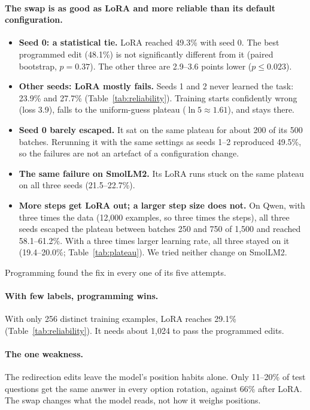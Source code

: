 \paragraph{The swap is as good as LoRA and more reliable than its default configuration.}
\begin{itemize}
  \item \textbf{Seed 0: a statistical tie.} LoRA reached 49.3\% with seed 0. The best programmed edit (48.1\%) is not significantly different from it (paired bootstrap, $p=0.37$). The other three are 2.9--3.6 points lower ($p\le0.023$).
  \item \textbf{Other seeds: LoRA mostly fails.} Seeds 1 and 2 never learned the task: 23.9\% and 27.7\% (Table~\ref{tab:reliability}). Training starts confidently wrong (loss 3.9), falls to the uniform-guess plateau ($\ln 5\approx1.61$), and stays there.
  \item \textbf{Seed 0 barely escaped.} It sat on the same plateau for about 200 of its 500 batches. Rerunning it with the same settings as seeds 1--2 reproduced 49.5\%, so the failures are not an artefact of a configuration change.
  \item \textbf{The same failure on SmolLM2.} Its LoRA runs stuck on the same plateau on all three seeds (21.5--22.7\%).
  \item \textbf{More steps get LoRA out; a larger step size does not.} On Qwen, with three times the data (12,000 examples, so three times the steps), all three seeds escaped the plateau between batches 250 and 750 of 1,500 and reached 58.1--61.2\%. With a three times larger learning rate, all three stayed on it (19.4--20.0\%; Table~\ref{tab:plateau}). We tried neither change on SmolLM2.
\end{itemize}
Programming found the fix in every one of its five attempts.

\paragraph{With few labels, programming wins.} With only 256 distinct training examples, LoRA reaches 29.1\% (Table~\ref{tab:reliability}). It needs about 1,024 to pass the programmed edits.

\paragraph{The one weakness.} The redirection edits leave the model's position habits alone. Only 11--20\% of test questions get the same answer in every option rotation, against 66\% after LoRA. The swap changes what the model reads, not how it weighs positions.


